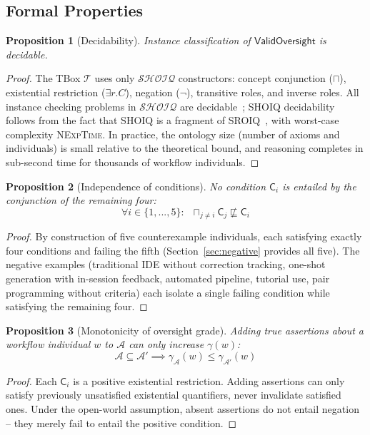 \documentclass[11pt]{article}
\newtheorem{proposition}{Proposition}[section]
\newcommand{\DL}{\ensuremath{\mathcal{SHOIQ}}\xspace}
\newcommand{\TBox}{\ensuremath{\mathcal{T}}\xspace}
\newcommand{\ABox}{\ensuremath{\mathcal{A}}\xspace}
\newcommand{\sqsub}{\sqsubseteq}
\DeclareMathOperator*{\bigsqcap}{\sqcap}
\begin{document}
\subsection{Formal Properties}
\label{sec:properties}

\begin{proposition}[Decidability]
\label{prop:decidability}
Instance classification of $\mathsf{ValidOversight}$ is decidable.
\end{proposition}
\begin{proof}
The TBox \TBox uses only \DL constructors: concept conjunction ($\sqcap$), existential restriction ($\exists r.C$), negation ($\neg$), transitive roles, and inverse roles.
All instance checking problems in \DL are decidable~\citep{baader2003description}; SHOIQ decidability follows from the fact that SHOIQ is a fragment of SROIQ~\citep{horrocks2006even}, with worst-case complexity \textsc{NExpTime}.
In practice, the ontology size (number of axioms and individuals) is small relative to the theoretical bound, and reasoning completes in sub-second time for thousands of workflow individuals.
\end{proof}

\begin{proposition}[Independence of conditions]
\label{prop:independence}
No condition $\mathsf{C}_i$ is entailed by the conjunction of the remaining four:
\begin{equation}
  \forall i \in \{1,...,5\}: \;\;
  \bigsqcap_{j \neq i} \mathsf{C}_j \not\sqsub \mathsf{C}_i
\end{equation}
\end{proposition}
\begin{proof}
By construction of five counterexample individuals, each satisfying exactly four conditions and failing the fifth (Section~\ref{sec:negative} provides all five).
The negative examples (traditional IDE without correction tracking, one-shot generation with in-session feedback, automated pipeline, tutorial use, pair programming without criteria) each isolate a single failing condition while satisfying the remaining four.
\end{proof}

\begin{proposition}[Monotonicity of oversight grade]
\label{prop:monotonicity}
Adding true assertions about a workflow individual $w$ to \ABox can only increase $\gamma(w)$:
\begin{equation}
  \ABox \subseteq \ABox' \implies \gamma_{\ABox}(w) \leq \gamma_{\ABox'}(w)
\end{equation}
\end{proposition}
\begin{proof}
Each $\mathsf{C}_i$ is a positive existential restriction.
Adding assertions can only satisfy previously unsatisfied existential quantifiers, never invalidate satisfied ones.
Under the open-world assumption, absent assertions do not entail negation -- they merely fail to entail the positive condition.
\end{proof}
\end{document}
